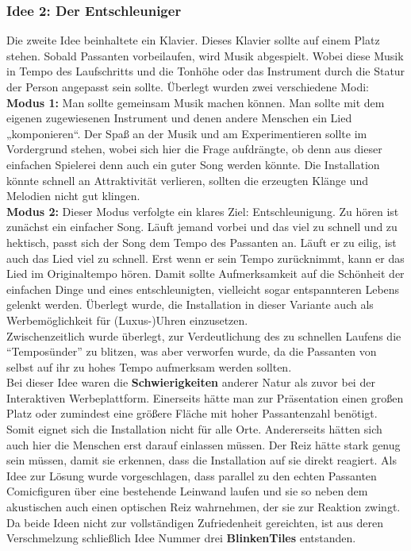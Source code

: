 \subsubsection{Idee 2: Der Entschleuniger}

Die zweite Idee beinhaltete ein Klavier. Dieses Klavier sollte auf einem Platz stehen. Sobald Passanten vorbeilaufen, wird Musik abgespielt. Wobei diese Musik in Tempo des Laufschritts und die Tonhöhe oder das Instrument durch die Statur der Person angepasst sein sollte. Überlegt wurden zwei verschiedene Modi:\\

\textbf{Modus 1:} Man sollte gemeinsam Musik machen können. Man sollte mit dem eigenen zugewiesenen Instrument und denen andere Menschen ein Lied „komponieren“. Der Spaß an der Musik und am Experimentieren sollte im Vordergrund stehen, wobei sich hier die Frage aufdrängte, ob denn aus dieser einfachen Spielerei denn auch ein guter Song werden könnte. Die Installation könnte schnell an Attraktivität verlieren, sollten die erzeugten Klänge und Melodien nicht gut klingen.\\

\textbf{Modus 2:} Dieser Modus verfolgte ein klares Ziel: Entschleunigung. Zu hören ist zunächst ein einfacher Song. Läuft jemand vorbei und das viel zu schnell und zu hektisch, passt sich der Song dem Tempo des Passanten an. Läuft er zu eilig, ist auch das Lied viel zu schnell. Erst wenn er sein Tempo zurücknimmt, kann er das Lied im Originaltempo hören. Damit sollte Aufmerksamkeit auf die Schönheit der einfachen Dinge und eines entschleunigten, vielleicht sogar entspannteren Lebens gelenkt werden. Überlegt wurde, die Installation in dieser Variante auch als Werbemöglichkeit für (Luxus-)Uhren einzusetzen.\\

Zwischenzeitlich wurde überlegt, zur Verdeutlichung des zu schnellen Laufens die “Temposünder” zu blitzen, was aber verworfen wurde, da die Passanten von selbst auf ihr zu hohes Tempo aufmerksam werden sollten.\\

Bei dieser Idee waren die \textbf{Schwierigkeiten} anderer Natur als zuvor bei der Interaktiven Werbeplattform. Einerseits hätte man zur Präsentation einen großen Platz oder zumindest eine größere Fläche mit hoher Passantenzahl benötigt. Somit eignet sich die Installation nicht für alle Orte. Andererseits hätten sich auch hier die Menschen erst darauf einlassen müssen. Der Reiz hätte stark genug sein müssen, damit sie erkennen, dass die Installation auf sie direkt reagiert. Als Idee zur Lösung wurde vorgeschlagen, dass parallel zu den echten Passanten Comicfiguren über eine bestehende Leinwand laufen und sie so neben dem akustischen auch einen optischen Reiz wahrnehmen, der sie zur Reaktion zwingt.\\

Da beide Ideen nicht zur vollständigen Zufriedenheit gereichten, ist aus deren Verschmelzung schließlich Idee Nummer drei \textbf{BlinkenTiles} entstanden.





